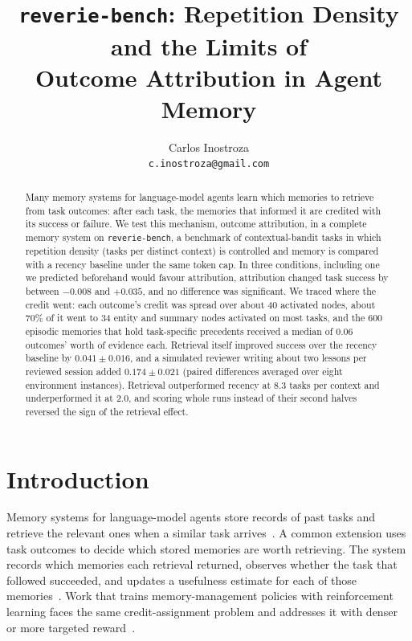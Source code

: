 \documentclass{article}
\title{\texttt{reverie-bench}: Repetition Density and the Limits of\\
Outcome Attribution in Agent Memory}
\author{%
  Carlos Inostroza\\
  \texttt{c.inostroza@gmail.com}
}
\newcommand{\bench}{\texttt{reverie-bench}}
\begin{document}
\maketitle

\begin{abstract}
Many memory systems for language-model agents learn which memories to retrieve from
task outcomes: after each task, the memories that informed it are credited with its
success or failure. We test this mechanism, outcome attribution, in a complete memory
system on \bench, a benchmark of contextual-bandit tasks in which repetition density
(tasks per distinct context) is controlled and memory is compared with a recency
baseline under the same token cap. In three conditions, including one we predicted
beforehand would favour attribution, attribution changed task success by between
$-0.008$ and $+0.035$, and no difference was significant. We traced where the credit
went: each outcome's credit was spread over about 40 activated nodes, about 70\% of it
went to 34 entity and summary nodes activated on most tasks, and the 600 episodic
memories that hold task-specific precedents received a median of 0.06 outcomes' worth
of evidence each. Retrieval itself improved success over the recency
baseline by $0.041 \pm 0.016$, and a simulated reviewer writing about two lessons per
reviewed session added $0.174 \pm 0.021$ (paired differences averaged over eight
environment instances). Retrieval outperformed recency at 8.3 tasks per context and
underperformed it at 2.0, and scoring whole runs instead of their second halves
reversed the sign of the retrieval effect.
\end{abstract}

\section{Introduction}

Memory systems for language-model agents store records of past tasks and retrieve the
relevant ones when a similar task arrives~\cite{expel,memp,synapse}. A common extension
uses task outcomes to decide which stored memories are worth retrieving. The system
records which memories each retrieval returned, observes whether the task that followed
succeeded, and updates a usefulness estimate for each of those
memories~\cite{whentoforget,romerl}. Work that trains memory-management policies with
reinforcement learning faces the same credit-assignment problem and addresses it with
denser or more targeted reward~\cite{memt,treecredit,memoryr2,himpo,metacog,attrimem}.
\end{document}
